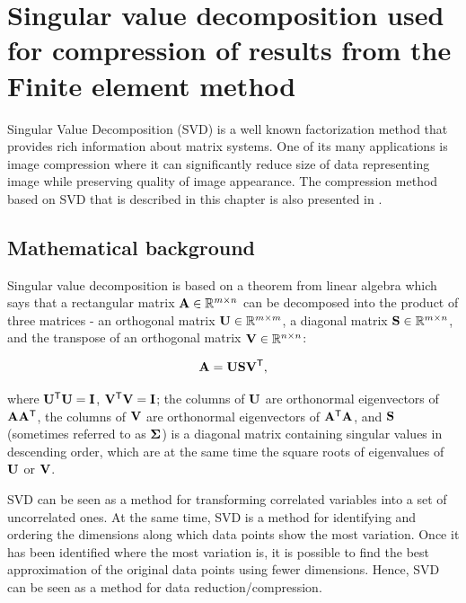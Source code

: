 \chapter[SVD for compression of results]{Singular value decomposition used for compression of results from the Finite element method}
\label{appendix-SVD}

Singular Value Decomposition (SVD) is a well known factorization method that provides rich information about matrix systems. One of its many applications is image compression where it can significantly reduce size of data representing image while preserving quality of image appearance. The compression method based on SVD that is described in this chapter is also presented in \cite{Benes2017}.


\section{Mathematical background}


Singular value decomposition \cite{Baker2005, Kalman1996, Golub1996} is based on a theorem from linear algebra which says that a rectangular matrix $\mathbf{A} \in \mathbb{R}^{m \times n}$ can be decomposed into the product of three matrices - an orthogonal matrix $\mathbf{U} \in \mathbb{R}^{m \times m}$, a diagonal
matrix $\mathbf{S} \in \mathbb{R}^{m \times n}$, and the transpose of an orthogonal matrix $\mathbf{V} \in \mathbb{R}^{n \times n}$:

\begin{equation}
\mathbf{A} = \mathbf{U} \mathbf{S} \mathbf{V}^\mathsf{T},
\label{eq:svd-def}
\end{equation}

\noindent
where $\mathbf{U^\mathsf{T}U} = \mathbf{I}$, $\mathbf{V^\mathsf{T}V} = \mathbf{I}$; the columns of $\mathbf{U}$ are orthonormal eigenvectors of $\mathbf{AA^\mathsf{T}}$, the columns of $\mathbf{V}$ are orthonormal eigenvectors of $\mathbf{A^\mathsf{T}A}$, and $\mathbf{S}$ (sometimes referred to as $\mathbf{\Sigma}$) is a diagonal matrix containing singular values in descending order, which are at the same time the square roots of eigenvalues of $\mathbf{U}$ or $\mathbf{V}$.

SVD can be seen as a method for transforming correlated variables into a set of uncorrelated ones. At the same time, SVD is a method for identifying and ordering the dimensions along which data points show the most variation. Once it has been identified where the most variation is, it is possible to find the best approximation of the original data points using fewer dimensions. Hence, SVD can be seen as a method for data reduction/compression.

